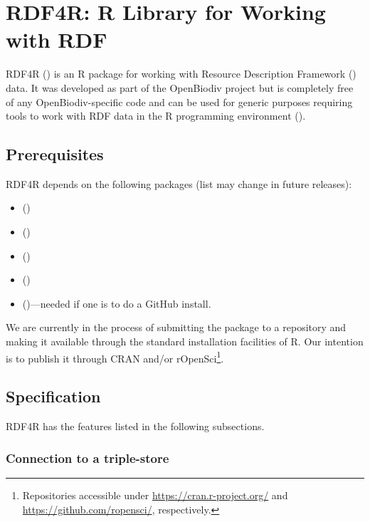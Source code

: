 \chapter{RDF4R: R Library for Working with RDF}
\label{chapter-rdf4r}

RDF4R () is an R package for working with Resource Description Framework (\cite{rdf_working_group_resource_2014}) data. It was developed as part of the OpenBiodiv project but is completely free of any OpenBiodiv-specific code and can be used for generic purposes requiring tools to work with RDF data in the R programming environment (\cite{r_core_team_r:_2016}).

\section{Prerequisites}

RDF4R depends on the following packages (list may change in future releases):

\begin{itemize}
\item{ (\cite{grothendieck_gsubfn:_2018})}
\item{ (\cite{wickham_httr:_2017})}
\item{ (\cite{wickham_xml2:_2018})}
\item{ (\cite{chang_r6:_2017})}
\item{{ (\cite{wickham_devtools:_2018})}---needed if one is to do a GitHub install.}
\end{itemize}

We are currently in the process of submitting the package to a repository and making it available through the standard installation facilities of R. Our intention is to publish it through CRAN and/or rOpenSci\footnote{Repositories accessible under \url{https://cran.r-project.org/} and \url{https://github.com/ropensci/}, respectively.}.

\section{Specification}

RDF4R has the features listed in the following subsections.

\subsection{Connection to a triple-store}

